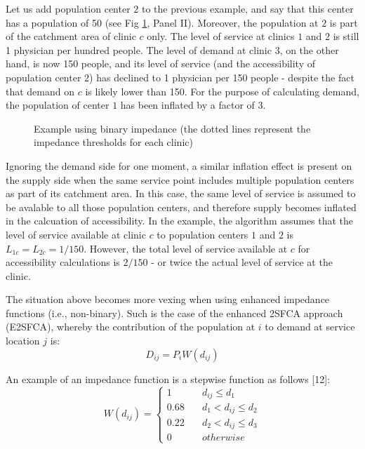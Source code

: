 \documentclass[10pt,letterpaper]{article}
\begin{document}
Let us add population center \(2\) to the previous example, and say that
this center has a population of 50 (see Fig \ref{fig:fig1-example-1},
Panel II). Moreover, the population at \(2\) is part of the catchment
area of clinic \(c\) only. The level of service at clinics \(1\) and
\(2\) is still 1 physician per hundred people. The level of demand at
clinic \(3\), on the other hand, is now 150 people, and its level of
service (and the accessibility of population center \(2\)) has declined
to 1 physician per 150 people - despite the fact that demand on \(c\) is
likely lower than 150. For the purpose of calculating demand, the
population of center \(1\) has been inflated by a factor of 3.

\begin{figure}[htbp]
\centering
\caption{\label{fig:fig1-example-1}Example using binary impedance (the
dotted lines represent the impedance thresholds for each clinic)}
\end{figure}

Ignoring the demand side for one moment, a similar inflation effect is
present on the supply side when the same service point includes multiple
population centers as part of its catchment area. In this case, the same
level of service is assumed to be avalable to all those population
centers, and therefore supply becomes inflated in the calcuation of
accessibility. In the example, the algorithm assumes that the level of
service available at clinic \(c\) to population centers \(1\) and \(2\)
is \(L_{1c}=L_{2c}=1/150\). However, the total level of service
available at \(c\) for accessibility calculations is \(2/150\) - or
twice the actual level of service at the clinic.

The situation above becomes more vexing when using enhanced impedance
functions (i.e., non-binary). Such is the case of the enhanced 2SFCA
approach (E2SFCA), whereby the contribution of the population at \(i\)
to demand at service location \(j\) is: \[
D_{ij} = P_iW(d_{ij})
\]

An example of an impedance function is a stepwise function as follows
{[}12{]}: \[
W(d_{ij}) = \left\{
        \begin{array}{ll}
            1 & \quad d_{ij} \leq d_1 \\
            0.68 & \quad d_1 < d_{ij} \leq d_2 \\
            0.22 & \quad d_2 < d_{ij} \leq d_3 \\
            0 & \quad otherwise
        \end{array}
    \right.
\]
\end{document}

